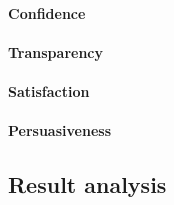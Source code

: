\paragraph{Confidence}
\paragraph{Transparency}
\paragraph{Satisfaction}
\paragraph{Persuasiveness}
	
\subsection{Result analysis}

\cleardoublepage